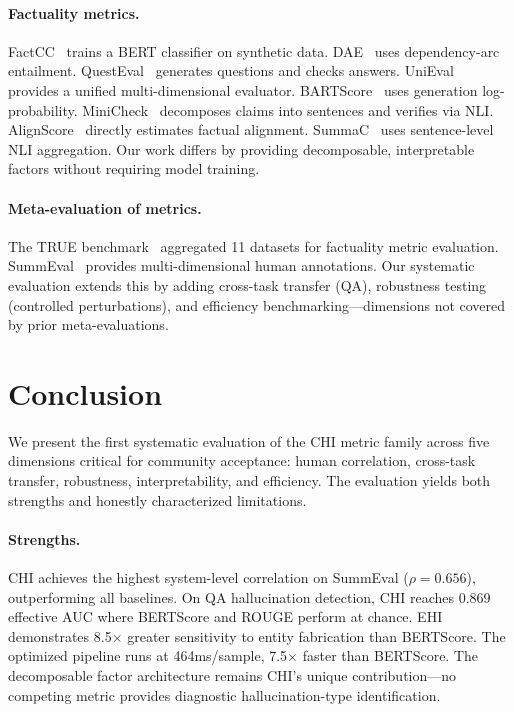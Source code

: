 \documentclass[11pt]{article}
\begin{document}
\paragraph{Factuality metrics.} FactCC~\cite{kryscinski2020evaluating} trains a BERT classifier on synthetic data. DAE~\cite{goyal2020evaluating} uses dependency-arc entailment. QuestEval~\cite{scialom2021questeval} generates questions and checks answers. UniEval~\cite{zhong2022towards} provides a unified multi-dimensional evaluator. BARTScore~\cite{yuan2021bartscore} uses generation log-probability. MiniCheck~\cite{tang2024minicheck} decomposes claims into sentences and verifies via NLI. AlignScore~\cite{zha2023alignscore} directly estimates factual alignment. SummaC~\cite{laban2022summac} uses sentence-level NLI aggregation. Our work differs by providing decomposable, interpretable factors without requiring model training.

\paragraph{Meta-evaluation of metrics.} The TRUE benchmark~\cite{honovich2022true} aggregated 11 datasets for factuality metric evaluation. SummEval~\cite{fabbri2021summeval} provides multi-dimensional human annotations. Our systematic evaluation extends this by adding cross-task transfer (QA), robustness testing (controlled perturbations), and efficiency benchmarking---dimensions not covered by prior meta-evaluations.


\section{Conclusion}

We present the first systematic evaluation of the CHI metric family across five dimensions critical for community acceptance: human correlation, cross-task transfer, robustness, interpretability, and efficiency. The evaluation yields both strengths and honestly characterized limitations.

\paragraph{Strengths.} CHI achieves the highest system-level correlation on SummEval ($\rho=0.656$), outperforming all baselines. On QA hallucination detection, CHI reaches 0.869 effective AUC where BERTScore and ROUGE perform at chance. EHI demonstrates 8.5$\times$ greater sensitivity to entity fabrication than BERTScore. The optimized pipeline runs at 464ms/sample, 7.5$\times$ faster than BERTScore. The decomposable factor architecture remains CHI's unique contribution---no competing metric provides diagnostic hallucination-type identification.
\end{document}
